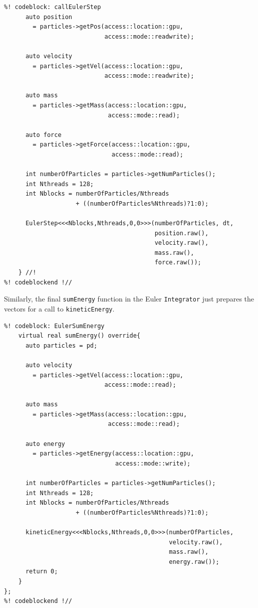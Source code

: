\begin{lstlisting}
%! codeblock: callEulerStep
      auto position
        = particles->getPos(access::location::gpu,
                            access::mode::readwrite);

      auto velocity
        = particles->getVel(access::location::gpu,
                            access::mode::readwrite);

      auto mass
        = particles->getMass(access::location::gpu,
                             access::mode::read);

      auto force
        = particles->getForce(access::location::gpu,
                              access::mode::read);

      int numberOfParticles = particles->getNumParticles();
      int Nthreads = 128;
      int Nblocks = numberOfParticles/Nthreads
                    + ((numberOfParticles%Nthreads)?1:0);

      EulerStep<<<Nblocks,Nthreads,0,0>>>(numberOfParticles, dt,
                                          position.raw(),
                                          velocity.raw(),
                                          mass.raw(),
                                          force.raw());
    } //!
%! codeblockend !//
\end{lstlisting}

Similarly, the final \texttt{sumEnergy} function in the Euler 
\texttt{Integrator} just prepares the vectors for a call to 
\texttt{kineticEnergy}.
\begin{lstlisting}
%! codeblock: EulerSumEnergy
    virtual real sumEnergy() override{
      auto particles = pd;

      auto velocity
        = particles->getVel(access::location::gpu,
                            access::mode::read);

      auto mass
        = particles->getMass(access::location::gpu,
                             access::mode::read);

      auto energy
        = particles->getEnergy(access::location::gpu,
                               access::mode::write);

      int numberOfParticles = particles->getNumParticles();
      int Nthreads = 128;
      int Nblocks = numberOfParticles/Nthreads
                    + ((numberOfParticles%Nthreads)?1:0);

      kineticEnergy<<<Nblocks,Nthreads,0,0>>>(numberOfParticles,
                                              velocity.raw(),
                                              mass.raw(),
                                              energy.raw());
      return 0;
    }
};
%! codeblockend !//
\end{lstlisting}

